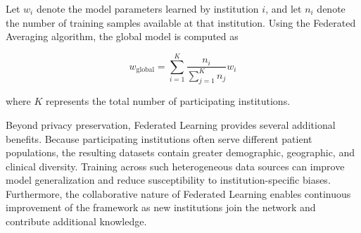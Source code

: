 Let $w_i$ denote the model parameters learned by institution $i$, and let $n_i$ denote the number of training samples available at that institution. Using the Federated Averaging algorithm, the global model is computed as

\begin{equation}
	w_{\text{global}}
	=
	\sum_{i=1}^{K}
	\frac{n_i}{\sum_{j=1}^{K}n_j}
	w_i
\end{equation}

where $K$ represents the total number of participating institutions.

Beyond privacy preservation, Federated Learning provides several additional benefits. Because participating institutions often serve different patient populations, the resulting datasets contain greater demographic, geographic, and clinical diversity. Training across such heterogeneous data sources can improve model generalization and reduce susceptibility to institution-specific biases. Furthermore, the collaborative nature of Federated Learning enables continuous improvement of the framework as new institutions join the network and contribute additional knowledge.
